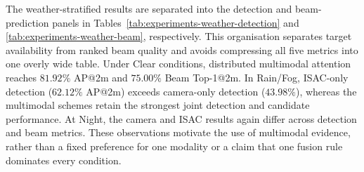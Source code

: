 \begin{table}[H]
    \centering
    \caption{Overall detection and beam-prediction results.  Beam metrics are
    evaluated for detections matched within 2~m.}
    \label{tab:experiments-modalities}
    \resizebox{\textwidth}{!}{%
    }
\end{table}

The weather-stratified results are separated into the detection and
beam-prediction panels in Tables~\ref{tab:experiments-weather-detection} and
\ref{tab:experiments-weather-beam}, respectively.  This organisation separates
target availability from ranked beam quality and avoids compressing all five
metrics into one overly wide table.  Under Clear
conditions, distributed multimodal attention reaches \(81.92\%\) AP@2m and
\(75.00\%\) Beam Top-1@2m.  In Rain/Fog, ISAC-only detection
(\(62.12\%\) AP@2m) exceeds camera-only detection (\(43.98\%\)), whereas the
multimodal schemes retain the strongest joint detection and candidate
performance.  At Night, the camera and ISAC results again differ across
detection and beam metrics.  These observations motivate the use of multimodal
evidence, rather than a fixed preference for one modality or a claim that one
fusion rule dominates every condition.

